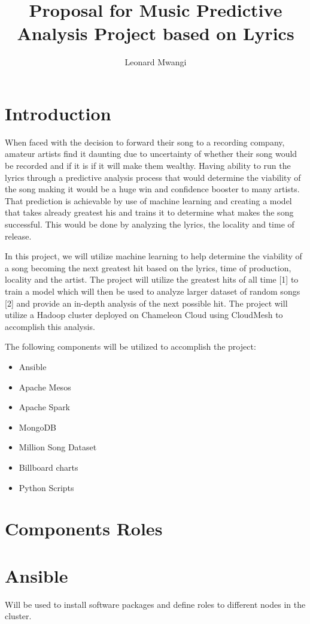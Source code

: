 \documentclass[9pt,twocolumn,twoside]{styles/osajnl}
\title{Proposal for Music Predictive Analysis Project based on Lyrics}
\author[1,*]{Leonard Mwangi}
\affil[1]{School of Informatics and Computing, Bloomington, IN 47408, U.S.A.}
\affil[*]{Corresponding authors: lmwangi@iu.com}
\begin{document}
\maketitle

\section{Introduction}
When faced with the decision to forward their song to a recording
company, amateur artists find it daunting due to uncertainty of
whether their song would be recorded and if it is if it will make them
wealthy.  Having ability to run the lyrics through a predictive
analysis process that would determine the viability of the song making
it would be a huge win and confidence booster to many artists. That
prediction is achievable by use of machine learning and creating a
model that takes already greatest his and trains it to determine what
makes the song successful. This would be done by analyzing the lyrics,
the locality and time of release.

In this project, we will utilize machine learning to help determine
the viability of a song becoming the next greatest hit based on the
lyrics, time of production, locality and the artist. The project will
utilize the greatest hits of all time [1] to train a model which will
then be used to analyze larger dataset of random songs [2] and provide
an in-depth analysis of the next possible hit. The project will
utilize a Hadoop cluster deployed on Chameleon Cloud using CloudMesh
to accomplish this analysis.

The following components will be utilized to accomplish the project:
\begin{itemize}
\item Ansible
\item Apache Mesos
\item Apache Spark
\item MongoDB
\item Million Song Dataset
\item Billboard charts
\item Python Scripts
\end{itemize}

\section{Components Roles}

\section*{Ansible}
Will be used to install software packages and define roles to
different nodes in the cluster.
\end{document}
